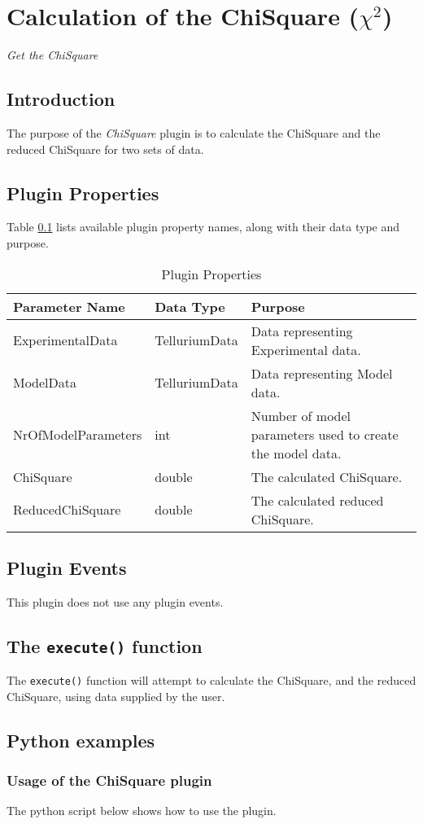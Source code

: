 \chapter*{Calculation of the ChiSquare ($\chi^2$)}
\setcounter{chapter}{1}
\emph{Get the ChiSquare}

\section{Introduction}
The purpose of the \emph{ChiSquare} plugin is to calculate the ChiSquare and the reduced ChiSquare for two sets of data.
 
\section{Plugin Properties}
Table \ref{table:PluginProperties} lists available plugin property names, along with their data type and purpose.


\begin{table}[ht]
\centering %
\begin{tabular}{l l p{7.5cm}} %

Parameter Name & Data Type & Purpose \\ [0.5ex] %
\hline %
ExperimentalData		& 	TelluriumData   	& Data representing Experimental data. \\
ModelData 				& 	TelluriumData   	& Data representing Model data. \\
NrOfModelParameters		& 	int   				& Number of model parameters used to create the model data. \\
ChiSquare     			& 	double		   		& The calculated ChiSquare. \\
ReducedChiSquare 		& 	double		   		& The calculated reduced ChiSquare. \\

\hline %
\end{tabular}
\caption{Plugin Properties} 
\label{table:PluginProperties} 
\end{table}

\section{Plugin Events}
This plugin does not use any plugin events.

\section{The \texttt{execute()} function}
The \verb|execute()| function will attempt to calculate the ChiSquare, and the reduced ChiSquare, using data supplied by the user. 

\section{Python examples}

\subsection{Usage of the ChiSquare plugin}
The python script below shows how to use the plugin. 

\begin{singlespace}

\end{singlespace}

